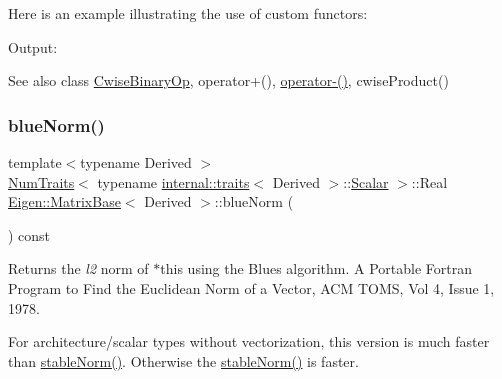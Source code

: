Here is an example illustrating the use of custom functors\+: 
\begin{DoxyCodeInclude}{0}
\end{DoxyCodeInclude}
 Output\+: 
\begin{DoxyVerbInclude}
\end{DoxyVerbInclude}


\begin{DoxySeeAlso}{See also}
class \mbox{\hyperlink{class_eigen_1_1_cwise_binary_op}{Cwise\+Binary\+Op}}, operator+(), \mbox{\hyperlink{class_eigen_1_1_matrix_base_a65cba62d44d32bce299e17f2d8970277}{operator-\/()}}, cwise\+Product() 
\end{DoxySeeAlso}
\mbox{\label{class_eigen_1_1_matrix_base_a3f3faa00163c16824ff03e58a210c74c}} 
\subsubsection{\texorpdfstring{blueNorm()}{blueNorm()}}
{\footnotesize\ttfamily template$<$typename Derived $>$ \\
\mbox{\hyperlink{struct_eigen_1_1_num_traits}{Num\+Traits}}$<$ typename \mbox{\hyperlink{struct_eigen_1_1internal_1_1traits}{internal\+::traits}}$<$ Derived $>$\+::\mbox{\hyperlink{class_eigen_1_1_dense_base_a5feed465b3a8e60c47e73ecce83e39a2}{Scalar}} $>$\+::Real \mbox{\hyperlink{class_eigen_1_1_matrix_base}{Eigen\+::\+Matrix\+Base}}$<$ Derived $>$\+::blue\+Norm (\begin{DoxyParamCaption}{ }\end{DoxyParamCaption}) const\hspace{0.3cm}{\ttfamily [inline]}}

\begin{DoxyReturn}{Returns}
the {\itshape l2} norm of {\ttfamily $\ast$this} using the Blue\textquotesingle{}s algorithm. A Portable Fortran Program to Find the Euclidean Norm of a Vector, A\+CM T\+O\+MS, Vol 4, Issue 1, 1978.
\end{DoxyReturn}
For architecture/scalar types without vectorization, this version is much faster than \mbox{\hyperlink{class_eigen_1_1_matrix_base_ab84d3e64f855813b1eea4202c0697dc1}{stable\+Norm()}}. Otherwise the \mbox{\hyperlink{class_eigen_1_1_matrix_base_ab84d3e64f855813b1eea4202c0697dc1}{stable\+Norm()}} is faster.

